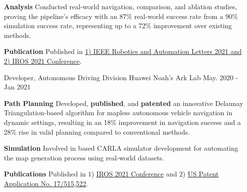 \begin{cventries}
{\begin{cvitems}
{			}
			\item {
				\textbf{Analysis} Conducted real-world navigation, comparison, and ablation studies, proving the pipeline's efficacy with an 87\% real-world success rate from a 90\% simulation success rate, representing up to a 72\% improvement over existing methods.
			}
			\item {
				\textbf{Publication} Published in \href{https://ieeexplore.ieee.org/document/9468918}{1) IEEE Robotics and Automation Letters 2021 and 2) IROS 2021 Conference}.
			}
		\end{cvitems}
	}
	\cventry
	{Developer, Autonomous Driving Division}
	{Huawei Noah’s Ark Lab}
	{May. 2020 - Jan 2021}
	{}
	{
		\begin{cvitems}
			\item {
				\textbf{Path Planning} Developed, \textbf{published}, and \textbf{patented} an innovative Delaunay Triangulation-based algorithm for mapless autonomous vehicle navigation in dynamic settings, resulting in an 18\% improvement in navigation success and a 28\% rise in valid planning compared to conventional methods.
			}
			\item {
				\textbf{Simulation} Involved in based CARLA simulator development for automating the map generation process using real-world datasets.
			}
			\item{
				\textbf{Publications} Published in 1) \href{https://ieeexplore.ieee.org/document/9636067}{IROS 2021 Conference} and 2) \href{https://patents.google.com/patent/US20220135068A1/en}{US Patent Application No. 17/515,522}.
			}
		\end{cvitems}
	}

\end{cventries}
